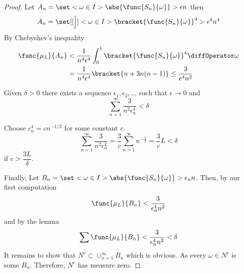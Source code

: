 \begin{proof}
    Let \(A_n = \set<\omega \in I>{\abs{\func{S_n}{\omega}} > \epsilon n}\) then 
    \begin{equation*}
        A_n = \set[[\Big]]<\omega \in I>{\bracket{\func{S_n}{\omega}}^4 > \epsilon^4 n^4}
    \end{equation*}
    By Chebyshev's inequality
    \begin{align*}
        \func{\mu_L}{A_n} &< \dfrac{1}{n^4 \epsilon^4} \int_0^1 \bracket{\func{S_n}{\omega}}^4 \diffOperator \omega \\
        &= \dfrac{1}{n^4 \epsilon^4} \bracket{n + 3n(n-1)} \leq \dfrac{3}{\epsilon^4 n^2}
    \end{align*}
    \begin{lemma}
        Given \(\delta > 0\) there exists a sequence \(\epsilon_1, \epsilon_2, \dots \) such that \(\epsilon \to 0\) and 
        \begin{equation*}
            \sum_{n = 1}^{\infty} \dfrac{3}{n^2 \epsilon_n^4} < \delta
        \end{equation*}
    \end{lemma}
    \begin{prooflemma}
        Choose \(\epsilon_n^4 = cn^{-1/2}\) for some constant \(c\). 
        \begin{equation*}
            \sum_{n = 1}^{\infty} \dfrac{3}{n^2 \epsilon_n^4} =\dfrac{3}{c} \sum_{n = 1}^{\infty} n^{-\frac{3}{2}} = \dfrac{3}{c}L < \delta
        \end{equation*}
        if \(c > \dfrac{3L}{\delta}\).
    \end{prooflemma}
    Finally, Let \(B_n = \set<\omega \in I> {\abs{\func{S_n}{\omega}} > \epsilon_n n}\). Then, by our first computation 
    \begin{equation*}
        \func{\mu_L}{B_n} < \dfrac{3}{\epsilon_n^4 n^2}
    \end{equation*}
    and by the lemma 
    \begin{equation*}
        \sum  \func{\mu_L}{B_n} < \dfrac{3}{\epsilon_n^4 n^2} < \delta 
    \end{equation*}
    It remains to show that \(N^c \subset \cup_{n = 1}^{\infty} B_n\) which is obvious. As every \(\omega \in N^c\) is some \(B_n\). Therefore, \(N^c\) has measure zero.
\end{proof}
